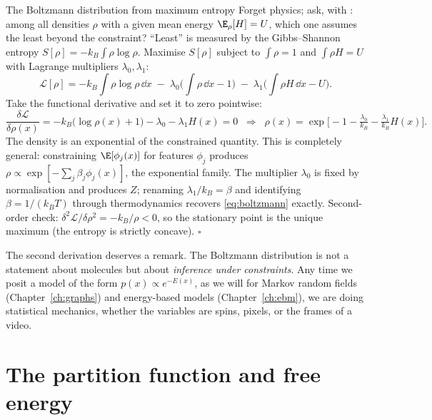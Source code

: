 \begin{toolbox}[tb:maxent]{The Boltzmann distribution from maximum entropy}
Forget physics; ask, with \citet{jaynes1957information}: among all
densities $\rho$ with a given mean energy $\E_\rho[H] = U$, which one
assumes the least beyond the constraint? ``Least'' is measured by the
Gibbs--Shannon entropy $S[\rho] = -k_B \int \rho \log \rho$. Maximise
$S[\rho]$ subject to $\int \rho = 1$ and $\int \rho H = U$ with Lagrange
multipliers $\lambda_0, \lambda_1$:
\begin{equation*}
  \mathcal{L}[\rho]
  = -k_B \!\int\! \rho \log \rho \,\dd x
  \;-\; \lambda_0 \Big( \!\int\! \rho \,\dd x - 1 \Big)
  \;-\; \lambda_1 \Big( \!\int\! \rho H \,\dd x - U \Big).
\end{equation*}
Take the functional derivative and set it to zero pointwise:
\begin{equation*}
  \frac{\delta \mathcal{L}}{\delta \rho(x)}
  = -k_B\big(\log \rho(x) + 1\big) - \lambda_0 - \lambda_1 H(x) = 0
  \;\;\Longrightarrow\;\;
  \rho(x) = \exp\!\Big[-1 - \tfrac{\lambda_0}{k_B} - \tfrac{\lambda_1}{k_B} H(x)\Big].
\end{equation*}
The density is an exponential of the constrained quantity. This is
completely general: constraining $\E[\phi_j(x)]$ for features $\phi_j$
produces $\rho \propto \exp[-\sum_j \beta_j \phi_j(x)]$, the exponential
family. The multiplier $\lambda_0$ is fixed by normalisation and produces
$Z$; renaming $\lambda_1/k_B = \beta$ and identifying $\beta = 1/(k_B T)$
through thermodynamics recovers \eqref{eq:boltzmann} exactly.
Second-order check:
$\delta^2 \mathcal{L} / \delta \rho^2 = -k_B/\rho < 0$, so the stationary
point is the unique maximum (the entropy is strictly concave).
\hfill$\square$
\end{toolbox}

The second derivation deserves a remark. The Boltzmann distribution is
not a statement about molecules but about \emph{inference under
constraints}. Any time we posit a model of the form
$p(x) \propto e^{-E(x)}$, as we will for Markov random fields
(Chapter~\ref{ch:graphs}) and energy-based models
(Chapter~\ref{ch:ebm}), we are doing statistical mechanics, whether the
variables are spins, pixels, or the frames of a video.

\section{The partition function and free energy}\label{sec:free-energy}

